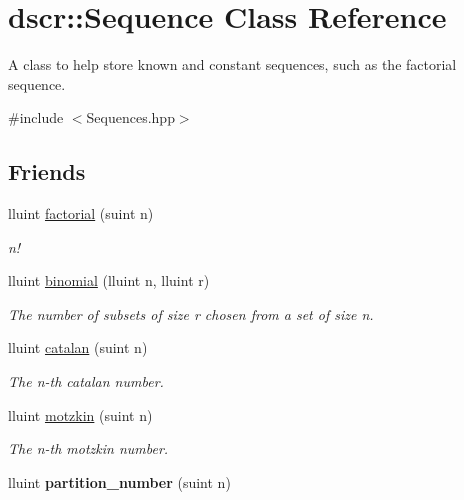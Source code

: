 \hypertarget{classdscr_1_1_sequence}{\section{dscr\-:\-:Sequence Class Reference}
\label{classdscr_1_1_sequence}
}


A class to help store known and constant sequences, such as the factorial sequence.  




{\ttfamily \#include $<$Sequences.\-hpp$>$}

\subsection*{Friends}
\begin{DoxyCompactItemize}
\item 
lluint \hyperlink{classdscr_1_1_sequence_a1270a98e6b77cec86abce9542711c0c6}{factorial} (suint n)
\begin{DoxyCompactList}\small\item\em n! \end{DoxyCompactList}\item 
lluint \hyperlink{classdscr_1_1_sequence_a11b1ced236502fd33a7851ae12912387}{binomial} (lluint n, lluint r)
\begin{DoxyCompactList}\small\item\em The number of subsets of size r chosen from a set of size n. \end{DoxyCompactList}\item 
lluint \hyperlink{classdscr_1_1_sequence_ad04fc4341da3f34fa6a57033586a7f76}{catalan} (suint n)
\begin{DoxyCompactList}\small\item\em The n-\/th catalan number. \end{DoxyCompactList}\item 
lluint \hyperlink{classdscr_1_1_sequence_ac733d5b9ab1f17f2e37cbcecffb985c0}{motzkin} (suint n)
\begin{DoxyCompactList}\small\item\em The n-\/th motzkin number. \end{DoxyCompactList}\item 
\hypertarget{classdscr_1_1_sequence_a7e719c2c0234b0c82e1bbd0dc0a7ca61}{lluint {\bfseries partition\-\_\-number} (suint n)}\label{classdscr_1_1_sequence_a7e719c2c0234b0c82e1bbd0dc0a7ca61}

\end{DoxyCompactItemize}


